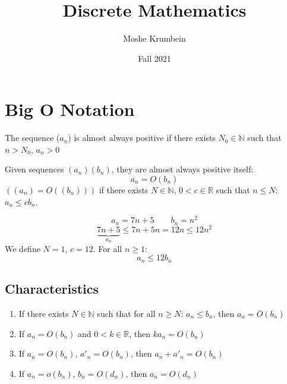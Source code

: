 \documentclass[00_complete]{subfiles}
\title{Discrete Mathematics}
\author{Moshe Krumbein}
\date{Fall 2021}
\begin{document}

\section{Big O Notation}
\begin{definition}
    The sequence ($a_n$) is almost always positive if there exists $N_0\in
    \mathbb{N}$ such that $n>N_0$, $a_n>0$
\end{definition}
\begin{definition}
    Given sequences $(a_n)(b_n)$, they are almost always positive itself:
    $$a_n=O(b_n)$$
    $((a_n)=O((b_n)))$ if there exists $N \in \mathbb{N}$, $0 <c \in
    \mathbb{R}$ such that $n \leq N$: $a_n \leq cb_n$.
\end{definition}
\begin{example}
    $$a_n=7n+5 \qquad b_n=n^2$$
    $$\underbrace{7n+5}_{a_n} \leq 7n+5n = 12n \leq 12n^2$$
    We define $N=1$, $c=12$. For all $n\geq 1$:
    $$a_n \leq 12b_n$$
\end{example}
\subsection{Characteristics}
\begin{enumerate}
    \item If there exists $N \in \mathbb{N}$ such that for all $n \geq N$: $a_n
        \leq b_n$, then $a_n = O(b_n)$
    \item If $a_n = O(b_n)$ and $0 < k \in \mathbb{R}$, then $ka_n=O(b_n)$
    \item If $a_n=O(b_n)$, $a'_n=O(b_n)$, then $a_n+a'_n=O(b_n)$
    \item If $a_n=o(b_n)$, $b_n=O(d_n)$, then $a_n = O(d_n)$
\end{enumerate}
\end{document}
